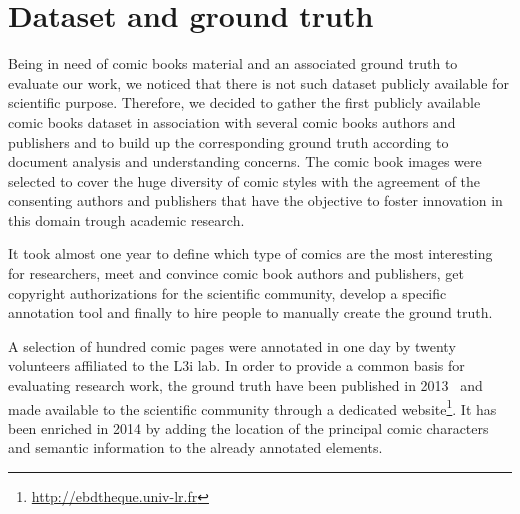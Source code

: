 

\section{Dataset and ground truth} %
\label{sec:dataset_and_ground_truth_construction}

Being in need of comic books material and an associated ground truth to evaluate our work, we noticed that there is not such dataset publicly available for scientific purpose. 
Therefore, we decided to gather the first publicly available comic books dataset in association with several comic books authors and publishers and to build up the corresponding ground truth according to document analysis and understanding concerns.
The comic book images were selected to cover the huge diversity of comic styles with the agreement of the consenting authors and publishers that have the objective to foster innovation in this domain trough academic research.



It took almost one year to define which type of comics are the most interesting for researchers, meet and convince comic book authors and publishers, get copyright authorizations for the scientific community, develop a specific annotation tool and finally to hire people to manually create the ground truth.

A selection of hundred comic pages were annotated in one day by twenty volunteers affiliated to the L3i lab.
In order to provide a common basis for evaluating research work, the ground truth have been published in 2013~\cite{Guerin2013} and made available to the scientific community through a dedicated website\footnote{\url{http://ebdtheque.univ-lr.fr}}.
It has been enriched in 2014 by adding the location of the principal comic characters and semantic information to the already annotated elements.


